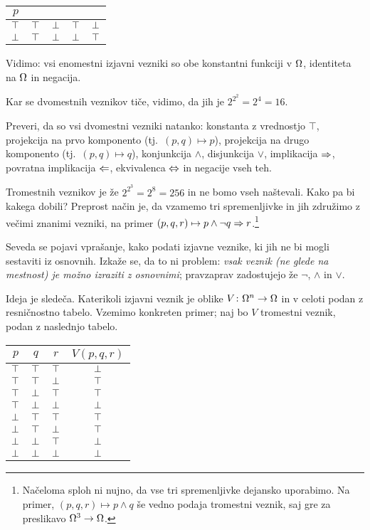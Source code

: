 		\begin{center}
			\begin{tabular}{c|cccc}
				$p$ &&&& \\
				\hline
				$\top$ & $\top$ & $\bot$ & $\top$ & $\bot$ \\
				$\bot$ & $\top$ & $\bot$ & $\bot$ & $\top$
			\end{tabular}
		\end{center}
		
		Vidimo: vsi enomestni izjavni vezniki so obe konstantni funkciji v $\Omega$, identiteta na $\Omega$ in negacija.
		
		Kar se dvomestnih veznikov tiče, vidimo, da jih je $2^{2^2} = 2^4 = 16$.
		
		\begin{vaja}
			Preveri, da so vsi dvomestni vezniki natanko: konstanta z vrednostjo $\top$, projekcija na prvo komponento (tj.~$(p, q) \mapsto p$), projekcija na drugo komponento (tj.~$(p, q) \mapsto q$), konjunkcija $\land$, disjunkcija $\lor$, implikacija $\Rightarrow$, povratna implikacija $\Leftarrow$, ekvivalenca $\Leftrightarrow$ in negacije vseh teh.
		\end{vaja}
		
		Tromestnih veznikov je že $2^{2^3} = 2^8 = 256$ in ne bomo vseh naštevali. Kako pa bi kakega dobili? Preprost način je, da vzamemo tri spremenljivke in jih združimo z večimi znanimi vezniki, na primer $(p, q, r) \mapsto p \land \lnot{q} \Rightarrow r$.\footnote{Načeloma sploh ni nujno, da vse tri spremenljivke dejansko uporabimo. Na primer, $(p, q, r) \mapsto p \land q$ še vedno podaja tromestni veznik, saj gre za preslikavo $\Omega^3 \to \Omega$.}
		
		Seveda se pojavi vprašanje, kako podati izjavne veznike, ki jih ne bi mogli sestaviti iz osnovnih. Izkaže se, da to ni problem: \emph{vsak veznik (ne glede na mestnost) je možno izraziti z osnovnimi}; pravzaprav zadostujejo že $\lnot$, $\land$ in $\lor$.
		
		Ideja je sledeča. Katerikoli izjavni veznik je oblike $V\colon \Omega^n \to \Omega$ in v celoti podan z resničnostno tabelo. Vzemimo konkreten primer; naj bo $V$ tromestni veznik, podan z naslednjo tabelo.
		
		\begin{center}
			\begin{tabular}{ccc|c}
				$p$ & $q$ & $r$ & $V(p, q, r)$ \\
				\hline
				$\top$ & $\top$ & $\top$ & $\bot$ \\
				$\top$ & $\top$ & $\bot$ & $\top$ \\
				$\top$ & $\bot$ & $\top$ & $\top$ \\
				$\top$ & $\bot$ & $\bot$ & $\bot$ \\
				$\bot$ & $\top$ & $\top$ & $\top$ \\
				$\bot$ & $\top$ & $\bot$ & $\top$ \\
				$\bot$ & $\bot$ & $\top$ & $\bot$ \\
				$\bot$ & $\bot$ & $\bot$ & $\bot$
			\end{tabular}
		\end{center}
		

